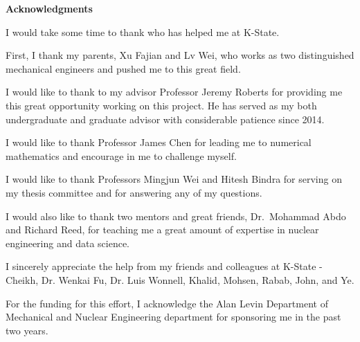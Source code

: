 
\newpage
\vspace*{0.9cm}
\begin{center}
{\bf \Huge Acknowledgments}
\end{center}

\setlength{\baselineskip}{0.8cm}


I would take some time to thank who has helped me at K-State.

First, I thank my parents, Xu Fajian and Lv Wei, who works as two distinguished mechanical engineers and pushed me to this great field.

I would like to thank to my advisor Professor Jeremy Roberts for providing me this great opportunity working on this project. He has served as my both undergraduate and graduate advisor with considerable patience since 2014.

I would like to thank Professor James Chen for leading me to numerical mathematics and encourage in me to challenge myself.   

I would like to thank Professors Mingjun Wei and Hitesh Bindra for serving on my thesis committee and for answering any of my questions.

I would also like to thank two mentors and great friends, Dr.~Mohammad Abdo and Richard Reed, for teaching me a great amount of expertise in nuclear engineering and data science.

I sincerely appreciate the help from my friends and colleagues at K-State - Cheikh, Dr. Wenkai Fu, Dr. Luis Wonnell, Khalid, Mohsen, Rabab, John, and Ye.

For the funding for this effort, I acknowledge the Alan Levin Department of Mechanical and Nuclear Engineering department for sponsoring me in the past two years. 